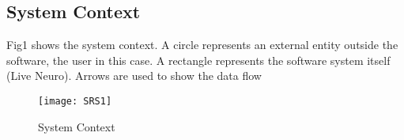 \documentclass[12pt]{article}
\begin{document}
\subsection{System Context}

Fig1 shows the system context. A circle represents an external entity outside
the software, the user in this case. A rectangle represents the software system itself
(Live Neuro). Arrows are used to show the data flow

\begin{figure}[h!]
\begin{center}
 \texttt{[image: SRS1]}
\caption{System Context}
\label{Fig_SystemContext} 
\end{center}
\end{figure}

\end{document}
